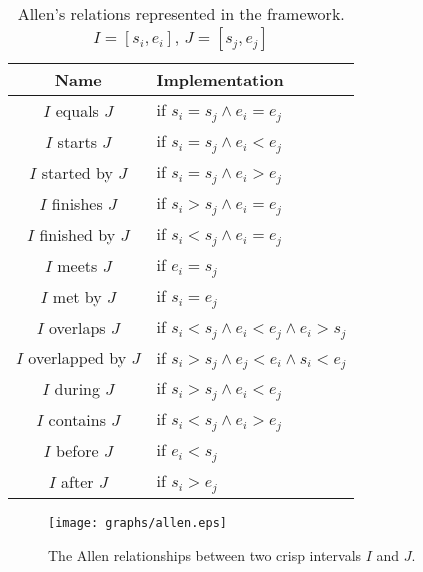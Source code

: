 \begin{table}[h]
\centering
\begin{tabular}{|c|l|}
\hline
Name & Implementation \\ \hline 
$I$ equals $J$ & if $s_i = s_j \wedge e_i = e_j $ \\
$I$ starts $J$ & if $s_i = s_j \wedge e_i < e_j $ \\
$I$ started by $J$ & if $s_i = s_j \wedge e_i > e_j $ \\
$I$ finishes $J$ & if $s_i > s_j \wedge e_i = e_j $ \\
$I$ finished by $J$ & if $s_i < s_j \wedge e_i = e_j $ \\
$I$ meets $J$ & if $e_i = s_j $ \\
$I$ met by $J$ & if $s_i = e_j $ \\
$I$ overlaps $J$ & if $s_i < s_j \wedge e_i < e_j \wedge e_i > s_j $ \\
$I$ overlapped by $J$ & if $s_i > s_j \wedge e_j < e_i \wedge s_i < e_j  $ \\
$I$ during $J$ & if $s_i > s_j \wedge e_i < e_j $ \\
$I$ contains $J$ & if $  s_i < s_j \wedge e_i > e_j$ \\
$I$ before $J$ & if $e_i < s_j $ \\
$I$ after $J$ & if $s_i > e_j $ \\
\hline
\end{tabular}
\caption{Allen's relations represented in the framework. $I = \left[s_i, e_i\right]$, $J=  \left[s_j, e_j\right]$}
\label{tab:allen-relations}
\end{table}


\begin{figure}[h]
   \centering
   \texttt{[image: graphs/allen.eps]}
   \caption{The Allen relationships between two crisp intervals $I$ and $J$.  }
   \label{fig:allen-relationships}
 \end{figure}
